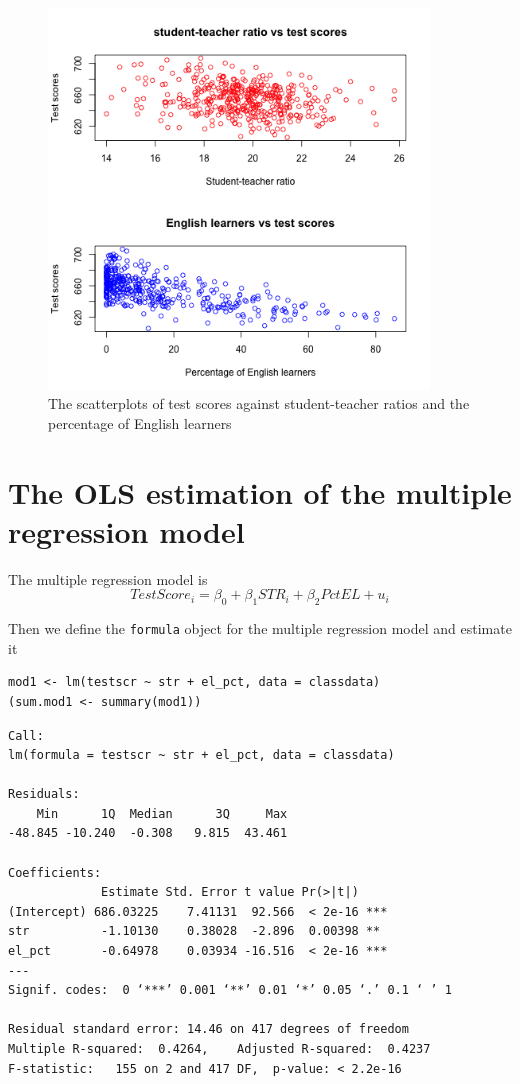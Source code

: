 \documentclass[11pt]{article}
\begin{document}
\begin{figure}[htbp]
\centering
\includegraphics[width=0.9\textwidth]{./img/sp2.png}
\caption{The scatterplots of test scores against student-teacher ratios and the percentage of English learners}
\end{figure}

\section{The OLS estimation of the multiple regression model}
\label{sec:org8aaccd7}

The multiple regression model is
\begin{equation}
\label{eq:testscr-str-1}
TestScore_i = \beta_0 + \beta_1 STR_i + \beta_2 PctEL + u_i
\end{equation}

Then we define the \texttt{formula} object for the multiple regression
model and estimate it

\begin{verbatim}
mod1 <- lm(testscr ~ str + el_pct, data = classdata)
(sum.mod1 <- summary(mod1))
\end{verbatim}

\begin{verbatim}
Call:
lm(formula = testscr ~ str + el_pct, data = classdata)

Residuals:
    Min      1Q  Median      3Q     Max
-48.845 -10.240  -0.308   9.815  43.461

Coefficients:
             Estimate Std. Error t value Pr(>|t|)
(Intercept) 686.03225    7.41131  92.566  < 2e-16 ***
str          -1.10130    0.38028  -2.896  0.00398 **
el_pct       -0.64978    0.03934 -16.516  < 2e-16 ***
---
Signif. codes:  0 ‘***’ 0.001 ‘**’ 0.01 ‘*’ 0.05 ‘.’ 0.1 ‘ ’ 1

Residual standard error: 14.46 on 417 degrees of freedom
Multiple R-squared:  0.4264,	Adjusted R-squared:  0.4237
F-statistic:   155 on 2 and 417 DF,  p-value: < 2.2e-16
\end{verbatim}
\end{document}
